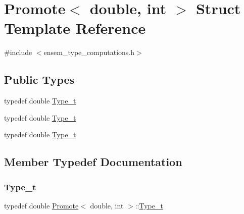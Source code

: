 \hypertarget{structPromote_3_01double_00_01int_01_4}{}\section{Promote$<$ double, int $>$ Struct Template Reference}
\label{structPromote_3_01double_00_01int_01_4}


{\ttfamily \#include $<$ensem\+\_\+type\+\_\+computations.\+h$>$}

\subsection*{Public Types}
\begin{DoxyCompactItemize}
\item 
typedef double \mbox{\hyperlink{structPromote_3_01double_00_01int_01_4_a55905f49138ff7e74738c0975fbfe652}{Type\+\_\+t}}
\item 
typedef double \mbox{\hyperlink{structPromote_3_01double_00_01int_01_4_a55905f49138ff7e74738c0975fbfe652}{Type\+\_\+t}}
\item 
typedef double \mbox{\hyperlink{structPromote_3_01double_00_01int_01_4_a55905f49138ff7e74738c0975fbfe652}{Type\+\_\+t}}
\end{DoxyCompactItemize}


\subsection{Member Typedef Documentation}
\mbox{\label{structPromote_3_01double_00_01int_01_4_a55905f49138ff7e74738c0975fbfe652}} 
\subsubsection{\texorpdfstring{Type\_t}{Type\_t}\hspace{0.1cm}{\footnotesize\ttfamily [1/3]}}
{\footnotesize\ttfamily typedef double \mbox{\hyperlink{structPromote}{Promote}}$<$ double, int $>$\+::\mbox{\hyperlink{structPromote_3_01double_00_01int_01_4_a55905f49138ff7e74738c0975fbfe652}{Type\+\_\+t}}}

\mbox{\label{structPromote_3_01double_00_01int_01_4_a55905f49138ff7e74738c0975fbfe652}} 
